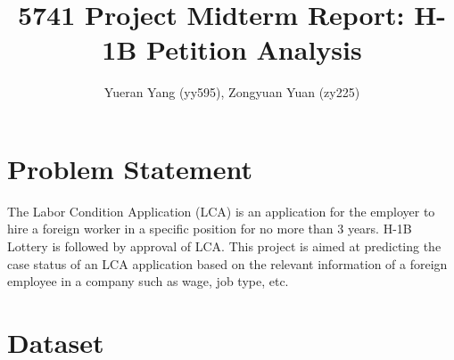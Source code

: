 \documentclass{article}
\title{\vspace{-1.5cm}5741 Project Midterm Report: H-1B Petition Analysis}
\author{Yueran Yang (yy595), Zongyuan Yuan (zy225)}
\date{}
\begin{document}
\maketitle
\vspace{-3em}

\section{Problem Statement}
The Labor Condition Application (LCA) is an application for the employer to hire a foreign worker in a specific position for no more than 3 years. H-1B Lottery is followed by approval of LCA. This project is aimed at predicting the case status of an LCA application based on the relevant information of a foreign employee in a company such as wage, job type, etc.

\section{Dataset}
\end{document}
